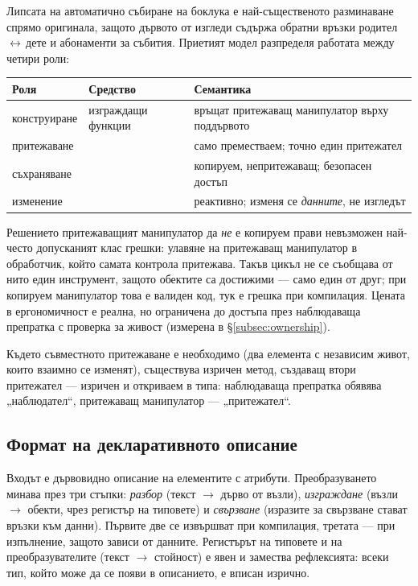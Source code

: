 Липсата на автоматично събиране на боклука е най-същественото разминаване спрямо
оригинала, защото дървото от изгледи съдържа обратни връзки
родител\,$\leftrightarrow$\,дете и абонаменти за събития. Приетият модел разпределя
работата между четири роли:

\begin{center}
\begin{tabular}{@{}L{3.1cm}L{3.4cm}L{7.2cm}@{}}
\textbf{Роля} & \textbf{Средство} & \textbf{Семантика} \\
\hline
конструиране & изграждащи функции & връщат притежаващ манипулатор върху поддървото \\
притежаване &  & само преместваем; точно един притежател \\
съхраняване &  & копируем, непритежаващ; безопасен достъп \\
изменение &  & реактивно; изменя се \emph{данните}, не изгледът \\
\end{tabular}
\end{center}

Решението притежаващият манипулатор да \emph{не} е копируем прави невъзможен най-често
допусканият клас грешки: улавяне на притежаващ манипулатор в обработчик, който самата
контрола притежава. Такъв цикъл не се съобщава от нито един инструмент, защото обектите са
достижими --- само един от друг; при копируем манипулатор това е валиден код, тук
е грешка при компилация. Цената в ергономичност е реална, но ограничена до достъпа през
наблюдаваща препратка с проверка за живост (измерена в §\ref{subsec:ownership}).

Където съвместното притежаване е необходимо (два елемента с независим живот,
които взаимно се изменят), съществува изричен метод, създаващ втори притежател --- изричен
и откриваем в типа: наблюдаваща препратка обявява „наблюдател“, притежаващ манипулатор ---
„притежател“.

\subsection{Формат на декларативното описание}
\label{subsec:xaml_design}

Входът е дървовидно описание на елементите с атрибути. Преобразуването минава през три
стъпки: \emph{разбор} (текст $\rightarrow$ дърво от възли), \emph{изграждане} (възли
$\rightarrow$ обекти, чрез регистър на типовете) и \emph{свързване} (изразите за свързване
стават връзки към данни). Първите две се извършват при компилация, третата --- при
изпълнение, защото зависи от данните. Регистърът на типовете и на преобразувателите (текст
$\rightarrow$ стойност) е явен и замества рефлексията: всеки тип, който може да се появи в
описанието, е вписан изрично.

